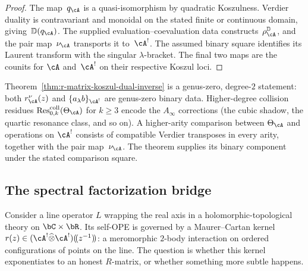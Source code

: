 \begin{proof}
The map~$q_\cA$ is a quasi-isomorphism by quadratic Koszulness.
Verdier duality is contravariant and monoidal on the stated finite or
continuous domain, giving~$\mathbb D(q_\cA)$.  The supplied
evaluation--coevaluation data constructs~$\rho_\cA^{\mathbb D}$, and
the pair map~$\nu_\cA$ transports it to~$\cA^!$.
The assumed binary square identifies its Laurent transform with the
singular $\lambda$-bracket.  The final two maps are the counits for
$\cA$ and~$\cA^!$ on their respective Koszul loci.
\end{proof}

\begin{remark}
\label{rem:r-matrix-inverse-genus-zero}
Theorem~\ref{thm:r-matrix-koszul-dual-inverse} is a
genus-zero, degree-$2$ statement: both $r_\cA^\nu(z)$ and
$\{a_\lambda b\}_{\cA^!}$ are genus-zero binary data.
Higher-degree collision residues
$\operatorname{Res}^{\mathrm{coll}}_{0,k}(\Theta_\cA)$
for $k \geq 3$ encode the $A_\infty$ corrections
(the cubic shadow, the quartic resonance class, and so on).
A higher-arity comparison between $\Theta_\cA$ and operations on
$\cA^!$ consists of compatible Verdier transposes in every arity,
together with the pair map~$\nu_\cA$.  The theorem supplies its
binary component under the stated comparison square.
\end{remark}


\subsection{The spectral factorization bridge}
\label{subsec:spectral-factorization-bridge}

Consider a line operator $L$ wrapping the real axis in a
holomorphic-topological theory on $\bC \times \bR$. Its
self-OPE is governed by a Maurer--Cartan kernel
$r(z) \in (\cA^! \widehat\otimes \cA^!)(\!(z^{-1})\!)$: a
meromorphic $2$-body interaction on ordered
configurations of points on the line.
The question is whether this kernel exponentiates to an honest
$R$-matrix, or whether something more subtle happens.

